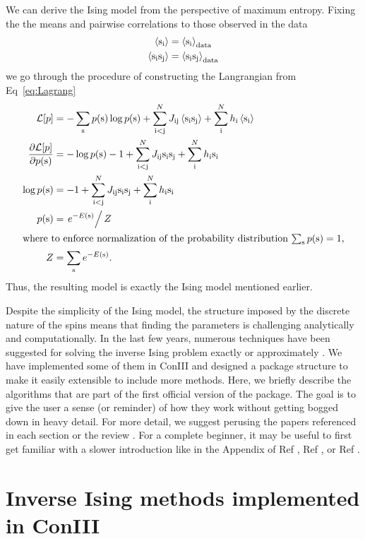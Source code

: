 \documentclass[aps,prl,twocolumn,nofootinbib]{revtex4-1}
\begin{document}
We can derive the Ising model from the perspective of maximum entropy. Fixing the the means and pairwise correlations to those observed in the data
\begin{align}
	\left<{\rm s}_{\rm i}\right> &= \left<{\rm s}_{\rm i}\right>_{\rm data} \\
	\left<{\rm s}_{\rm i}{\rm s}_{\rm j}\right> &= \left<{\rm s}_{\rm i}{\rm s}_{\rm j}\right>_{\rm data}
\end{align}
we go through the procedure of constructing the Langrangian from Eq~\ref{eq:Lagrang}
\begin{align}
	\mathcal{L}[p] &= -\sum_{\rm s} p({\rm s})\log p({\rm s}) +\sum_{\rm i<j}^N J_{\rm ij}\left<{\rm s}_{\rm i}{\rm s}_{\rm j}\right> +\sum_{\rm i}^Nh_{\rm i}\left<{\rm s}_{\rm i}\right>\\
	\frac{\partial\mathcal{L}[p]}{\partial p({\rm s})} &= -\log p({\rm s})-1 +\sum_{\rm i<j}^N J_{\rm ij}{\rm s}_{\rm i}{\rm s}_{\rm j} +\sum_{\rm i}^Nh_{\rm i}{\rm s}_{\rm i}\\
	\log p({\rm s}) &= -1 +\sum_{\rm i<j}^N J_{\rm ij}{\rm s}_{\rm i}{\rm s}_{\rm j} +\sum_{\rm i}^Nh_{\rm i}{\rm s}_{\rm i}\\
	p({\rm s}) &= \left.e^{-E({\rm s})}\right/Z\\
\intertext{where to enforce normalization of the probability distribution $\sum_{\rm s} p({\rm s}) = 1$,}
	Z &= \sum_{{\rm s}} e^{-E({\rm s})}.
\end{align}
Thus, the resulting model is exactly the Ising model mentioned earlier.

Despite the simplicity of the Ising model, the structure imposed by the discrete nature of the spins means that finding the parameters is challenging analytically and computationally. In the last few years, numerous techniques have been suggested for solving the inverse Ising problem exactly or approximately \cite{Nguyen:2017ww}. We have implemented some of them in ConIII and designed a package structure to make it easily extensible to include more methods.  Here, we briefly describe the algorithms that are part of the first official version of the package. The goal is to give the user a sense (or reminder) of how they work without getting bogged down in heavy detail. For more detail, we suggest perusing the papers referenced in each section or the review \cite{Nguyen:2017ww}. For a complete beginner, it may be useful to first get familiar with a slower introduction like in the Appendix of Ref \cite{Lee:2015ev}, Ref \cite{Bialek:2012ueb}, or Ref \cite{Bretthorst:2003ua}.



\section{Inverse Ising methods implemented in ConIII}
\end{document}
